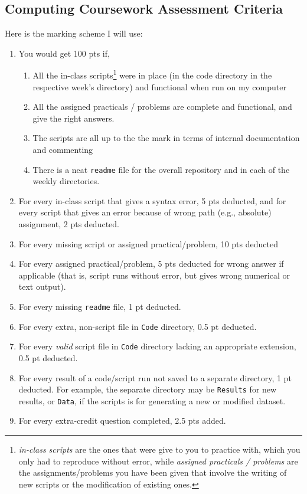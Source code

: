 \begin{appendices} \appendixpage \noappendicestocpagenum \addappheadtotoc
{}
\chapter{Computing Coursework Assessment Criteria} \label{chap:Appendices}

Here is the marking scheme I will use:

	\begin{enumerate}
    \item You would get 100 pts if,
			\begin{enumerate}
				\item All the in-class scripts\footnote{{\it in-class scripts} are the ones that were give to you to practice with, which you only had to reproduce without error, while {\it assigned practicals / problems} are the assignments/problems you have been given that involve the writing of new scripts or the modification of existing ones. } were in place (in the code 
				directory in the respective week's directory) and functional 
				when run on my computer
        \item All the assigned practicals / problems are complete and functional, 
        and give the right answers.
        \item The scripts are all up to the the mark in terms of internal documentation and commenting
        \item There is a neat {\tt readme} file for the overall repository and in each of the weekly directories.
      \end{enumerate}

    \item For every in-class script that gives a syntax error, 5 pts deducted, and for every script that gives an error because of wrong path (e.g., absolute) assignment, 2 pts deducted.
    \item For every missing script or assigned practical/problem, 10 pts deducted
    \item For every assigned practical/problem, 5 pts deducted for 
    wrong answer if applicable (that is, script runs without error, but 
    gives wrong numerical or text output).
    \item For every missing {\tt readme} file, 1 pt deducted.
		\item For every extra, non-script file in {\tt Code} directory, 0.5 
		pt deducted.
		\item For every {\it valid} script file in {\tt Code} directory 
		lacking an appropriate extension, 0.5 pt deducted.
		\item For every result of a code/script run not saved to a separate directory, 1 pt deducted. For example, the separate directory may be {\tt Results} for new results, or {\tt Data}, if the scripts is for generating a new or modified dataset.   
    \item For every extra-credit question completed, 2.5 pts added.
	\end{enumerate}


\end{appendices}
